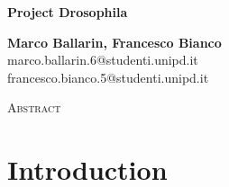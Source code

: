 \documentclass{article}
\begin{document}
\begin{center}
    \huge
    \textbf{Project Drosophila}  %
    
    \normalsize
    \vspace{0.4cm}
    \textbf{Marco Ballarin, Francesco Bianco}   \\ %
    marco.ballarin.6@studenti.unipd.it \\
    francesco.bianco.5@studenti.unipd.it

    \vspace{0.5cm}
    \Large
    \textsc{ Abstract}
    \begin{adjustwidth}{30pt}{30pt}
    \normalsize
    \vspace{0.3cm}
    
    \end{adjustwidth}
\end{center}
\newpage
\tableofcontents
\newpage

\section{Introduction \label{sec:intro}}

\newpage


\newpage


\newpage

\newpage



\newpage
\end{document}
